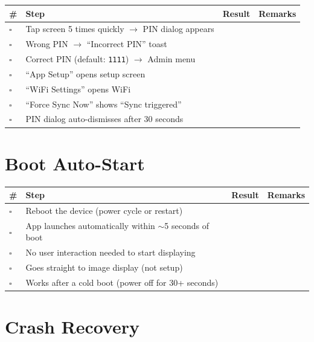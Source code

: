 \documentclass[11pt,a4paper]{article}
\newcommand{\checkbox}{$\square$\;}
\begin{document}
\begin{tabular}{@{}p{0.5cm}p{10cm}p{2cm}p{3cm}@{}}
\toprule
\textbf{\#} & \textbf{Step} & \textbf{Result} & \textbf{Remarks} \\
\midrule
\checkbox & Tap screen 5 times quickly $\rightarrow$ PIN dialog appears & & \\[0.3cm]
\checkbox & Wrong PIN $\rightarrow$ ``Incorrect PIN'' toast & & \\[0.3cm]
\checkbox & Correct PIN (default: \texttt{1111}) $\rightarrow$ Admin menu & & \\[0.3cm]
\checkbox & ``App Setup'' opens setup screen & & \\[0.3cm]
\checkbox & ``WiFi Settings'' opens WiFi & & \\[0.3cm]
\checkbox & ``Force Sync Now'' shows ``Sync triggered'' & & \\[0.3cm]
\checkbox & PIN dialog auto-dismisses after 30 seconds & & \\
\bottomrule
\end{tabular}

\section{Boot Auto-Start}

\begin{tabular}{@{}p{0.5cm}p{10cm}p{2cm}p{3cm}@{}}
\toprule
\textbf{\#} & \textbf{Step} & \textbf{Result} & \textbf{Remarks} \\
\midrule
\checkbox & Reboot the device (power cycle or restart) & & \\[0.3cm]
\checkbox & App launches automatically within $\sim$5 seconds of boot & & \\[0.3cm]
\checkbox & No user interaction needed to start displaying & & \\[0.3cm]
\checkbox & Goes straight to image display (not setup) & & \\[0.3cm]
\checkbox & Works after a cold boot (power off for 30+ seconds) & & \\
\bottomrule
\end{tabular}

\section{Crash Recovery}
\end{document}
